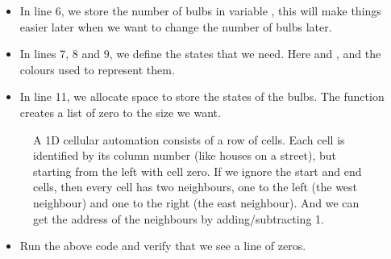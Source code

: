 \documentclass{coderdojo}
\newcommand\TODO[1]{
\begin{itemize}
\item[\todoSymbol] \color{todo} #1
\end{itemize}}
\begin{document}
\begin{itemize}
\item
In line 6, we store the number of bulbs in variable , this will make things easier later when we want to change the number of bulbs later.
\item
In lines 7, 8 and 9, we define the states that we need. Here  and , and the colours used to represent them.
\item
In line 11, we allocate space to store the states of the  bulbs. The function  creates a list of zero to the size we want. 
\end{itemize}

\vspace{-6pt}
\begin{figure}[H]
\caption{A 1D cellular automation consists of a row of cells. Each cell is identified by its column number (like houses on a street), but starting from the left with cell zero. \newline If we ignore the start and end cells, then every cell has two neighbours, one to the left (the west neighbour) and one to the right (the east neighbour). And we can get the address of the neighbours by adding/subtracting 1.}
\label{fig:1d}
\end{figure}

\TODO{Run the above code and verify that we see a line of zeros.}
\end{document}
